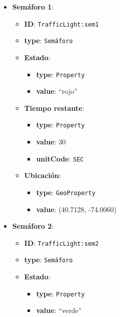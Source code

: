 \begin{enumerate}
        \begin{itemize}
            \item \textbf{Semáforo 1}:
                \begin{itemize}
                    \item \textbf{ID}: \texttt{TrafficLight:sem1}
                    \item \textbf{type}: \texttt{Semáforo}
                    \item \textbf{Estado}: 
                        \begin{itemize}
                            \item \textbf{type}: \texttt{Property}
                            \item \textbf{value}: “rojo”
                        \end{itemize}
                    \item \textbf{Tiempo restante}: 
                        \begin{itemize}
                            \item \textbf{type}: \texttt{Property}
                            \item \textbf{value}: 30
                            \item \textbf{unitCode}: \texttt{SEC}
                        \end{itemize}
                    \item \textbf{Ubicación}: 
                        \begin{itemize}
                            \item \textbf{type}: \texttt{GeoProperty}
                            \item \textbf{value}: (40.7128, -74.0060)
                        \end{itemize}
                \end{itemize}
            \item \textbf{Semáforo 2}:
                \begin{itemize}
                    \item \textbf{ID}: \texttt{TrafficLight:sem2}
                    \item \textbf{type}: \texttt{Semáforo}
                    \item \textbf{Estado}: 
                        \begin{itemize}
                            \item \textbf{type}: \texttt{Property}
                            \item \textbf{value}: “verde”

\end{itemize}
\end{itemize}
\end{itemize}
\end{enumerate}

